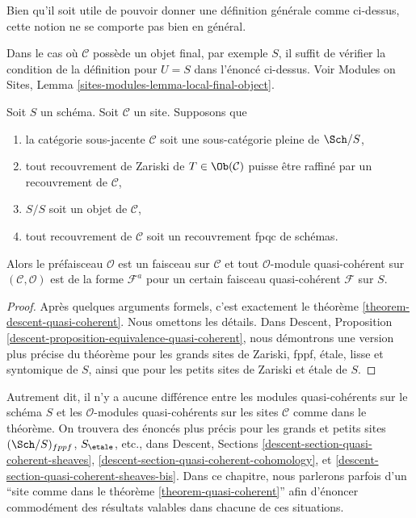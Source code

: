 \noindent
Bien qu'il soit utile de pouvoir donner une d\'efinition g\'en\'erale comme ci-dessus,
cette notion ne se comporte pas bien en g\'en\'eral.

\begin{remark}
\label{remark-final-object}
Dans le cas o\`u $\mathcal{C}$ poss\`ede un objet final, par exemple $S$, il
suffit de v\'erifier la condition de la d\'efinition pour
$U = S$ dans l'\'enonc\'e ci-dessus. Voir
Modules on Sites, Lemma \ref{sites-modules-lemma-local-final-object}.
\end{remark}

\begin{theorem}
\label{theorem-quasi-coherent}
Soit $S$ un sch\'ema.
Soit $\mathcal{C}$ un site. Supposons que
\begin{enumerate}
\item la cat\'egorie sous-jacente $\mathcal{C}$ soit une
sous-cat\'egorie pleine de $\Sch/S$,
\item tout recouvrement de Zariski de $T \in \Ob(\mathcal{C})$
puisse \^etre raffin\'e par un recouvrement de $\mathcal{C}$,
\item $S/S$ soit un objet de $\mathcal{C}$,
\item tout recouvrement de $\mathcal{C}$ soit un recouvrement fpqc de sch\'emas.
\end{enumerate}
Alors le pr\'efaisceau $\mathcal{O}$ est un faisceau sur $\mathcal{C}$ et
tout $\mathcal{O}$-module quasi-coh\'erent sur $(\mathcal{C}, \mathcal{O})$
est de la forme $\mathcal{F}^a$ pour un certain faisceau quasi-coh\'erent
$\mathcal{F}$ sur $S$.
\end{theorem}

\begin{proof}
Apr\`es quelques arguments formels, c'est exactement le th\'eor\`eme
\ref{theorem-descent-quasi-coherent}. Nous omettons les d\'etails. Dans
Descent, Proposition \ref{descent-proposition-equivalence-quasi-coherent},
nous d\'emontrons une version plus pr\'ecise du th\'eor\`eme pour les
grands sites de Zariski, fppf, \'etale, lisse et syntomique de $S$,
ainsi que pour les petits sites de Zariski et \'etale de $S$.
\end{proof}

\noindent
Autrement dit, il n'y a aucune diff\'erence entre les modules quasi-coh\'erents
sur le sch\'ema $S$ et les $\mathcal{O}$-modules quasi-coh\'erents
sur les sites $\mathcal{C}$ comme dans le th\'eor\`eme. On trouvera des \'enonc\'es plus pr\'ecis
pour les grands et petits sites $(\Sch/S)_{fppf}$, $S_\etale$, etc.,
dans Descent, Sections
\ref{descent-section-quasi-coherent-sheaves},
\ref{descent-section-quasi-coherent-cohomology}, et
\ref{descent-section-quasi-coherent-sheaves-bis}.
Dans ce chapitre, nous parlerons parfois d'un
``site comme dans le th\'eor\`eme \ref{theorem-quasi-coherent}''
afin d'\'enoncer commod\'ement des r\'esultats valables dans chacune de ces
situations.






